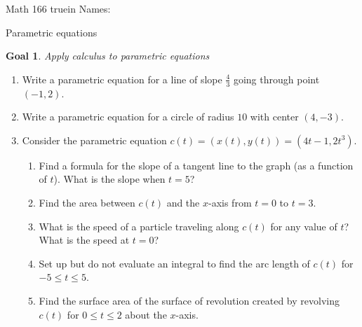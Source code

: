\documentclass[12pt]{article}
\newtheorem*{goal}{Goal}
\begin{document}
\pagestyle{empty} %

\noindent
{Math 166  truein  Names:\ \hrulefill}

\noindent
{Parametric equations}

\medskip

\begin{goal} \rm
Apply calculus to parametric equations
\end{goal}

\begin{enumerate}
\item Write a parametric equation for a line of slope $\frac{4}{3}$ going through point $(-1, 2)$. 
\vfill
\item Write a parametric equation for a circle of radius $10$ with center $(4, -3)$.
\vfill
\pagebreak
\item  Consider the parametric equation $c(t) = (x(t), y(t)) = (4t -1, 2t^3)$.
\begin{enumerate}
	
\item Find a formula for the slope of a tangent line to the graph (as a function of $t$). What
is the slope when $t = 5$?
\vfill
\item Find the area between $c(t)$ and the $x$-axis from $t = 0$ to $t = 3$.
\vfill
\item What is the speed of a particle traveling along $c(t)$ for any value of $t$? What is the speed at $t = 0$?
\vfill
\item Set up but do not evaluate an integral to find the arc length of $c(t)$ for $-5 \leq t \leq 5$.
\vfill
\item Find the surface area of the surface of revolution created by revolving $c(t)$ for $0 \leq t \leq 2$ about the $x$-axis.
\vfill
\end{enumerate}
\end{enumerate} 
\end{document}

